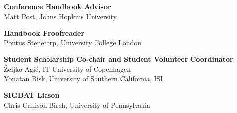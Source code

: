 {\bf Conference Handbook Advisor}\\
Matt Post, Johns Hopkins University

{\bf Handbook Proofreader}\\
Pontus Stenetorp, University College London

{\bf Student Scholarship Co-chair and Student Volunteer Coordinator}\\
Željko Agić, IT University of Copenhagen\\
Yonatan Bisk, University of Southern California, ISI

{\bf SIGDAT Liason}\\
Chris Callison-Birch, University of Pennsylvania
%
%
%
%
%
%
%
%
%
%

